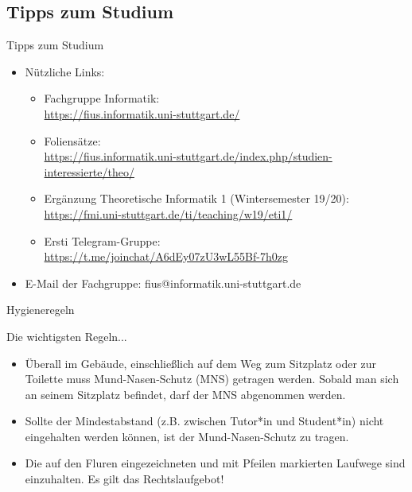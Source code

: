\subsection{Tipps zum Studium}
\begin{frame}[fragile]{Tipps zum Studium}
    \begin{itemize}
        \item Nützliche Links:\\
            \begin{itemize}
                \item Fachgruppe Informatik:\\
                \url{https://fius.informatik.uni-stuttgart.de/}
                \item Foliensätze:\\ \url{https://fius.informatik.uni-stuttgart.de/index.php/studien-interessierte/theo/}
                \item Ergänzung Theoretische Informatik 1 (Wintersemester 19/20): \\
                \url{https://fmi.uni-stuttgart.de/ti/teaching/w19/eti1/}
                \item Ersti Telegram-Gruppe:\\
                \url{https://t.me/joinchat/A6dEy07zU3wL55Bf-7h0zg}
        	\end{itemize}
        \item E-Mail der Fachgruppe: fius@informatik.uni-stuttgart.de

    \end{itemize}
\end{frame}

\begin{frame}[fragile]{Hygieneregeln}
	\begin{alertblock}{Die wichtigsten Regeln...}
		\begin{itemize}
			\item Überall im Gebäude, einschließlich auf dem Weg zum Sitzplatz oder zur Toilette muss Mund-Nasen-Schutz (MNS) getragen werden. Sobald man sich an seinem Sitzplatz befindet, darf der MNS abgenommen werden.
			\item Sollte der Mindestabstand (z.B. zwischen Tutor*in und Student*in) nicht eingehalten werden können, ist der Mund-Nasen-Schutz zu tragen.
			\item Die auf den Fluren eingezeichneten und mit Pfeilen markierten Laufwege sind einzuhalten. Es gilt das Rechtslaufgebot!
		\end{itemize}
	\end{alertblock}
\end{frame}

